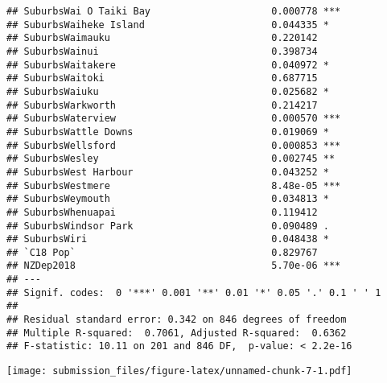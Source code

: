 \documentclass[
]{article}
\begin{document}
\begin{verbatim}
## SuburbsWai O Taiki Bay                     0.000778 ***
## SuburbsWaiheke Island                      0.044335 *  
## SuburbsWaimauku                            0.220142    
## SuburbsWainui                              0.398734    
## SuburbsWaitakere                           0.040972 *  
## SuburbsWaitoki                             0.687715    
## SuburbsWaiuku                              0.025682 *  
## SuburbsWarkworth                           0.214217    
## SuburbsWaterview                           0.000570 ***
## SuburbsWattle Downs                        0.019069 *  
## SuburbsWellsford                           0.000853 ***
## SuburbsWesley                              0.002745 ** 
## SuburbsWest Harbour                        0.043252 *  
## SuburbsWestmere                            8.48e-05 ***
## SuburbsWeymouth                            0.034813 *  
## SuburbsWhenuapai                           0.119412    
## SuburbsWindsor Park                        0.090489 .  
## SuburbsWiri                                0.048438 *  
## `C18 Pop`                                  0.829767    
## NZDep2018                                  5.70e-06 ***
## ---
## Signif. codes:  0 '***' 0.001 '**' 0.01 '*' 0.05 '.' 0.1 ' ' 1
## 
## Residual standard error: 0.342 on 846 degrees of freedom
## Multiple R-squared:  0.7061, Adjusted R-squared:  0.6362 
## F-statistic: 10.11 on 201 and 846 DF,  p-value: < 2.2e-16
\end{verbatim}

\texttt{[image: submission\_files/figure-latex/unnamed-chunk-7-1.pdf]}
\end{document}
